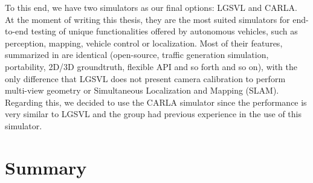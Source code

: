 To this end, we have two simulators as our final options: LGSVL and CARLA. At the moment of writing this thesis, they are the most suited simulators for end-to-end testing of unique functionalities offered by autonomous vehicles, such as perception, mapping, vehicle control or localization. Most of their features, summarized in \cite{kaur2021survey} are identical (open-source, traffic generation simulation, portability, 2D/3D groundtruth, flexible API and so forth and so on), with the only difference that LGSVL does not present camera calibration to perform multi-view geometry or Simultaneous Localization and Mapping (SLAM). Regarding this, we decided to use the CARLA simulator since the performance is very similar to LGSVL and the group had previous experience in the use of this simulator. %

\section{Summary}
\label{sec:2_summary}

